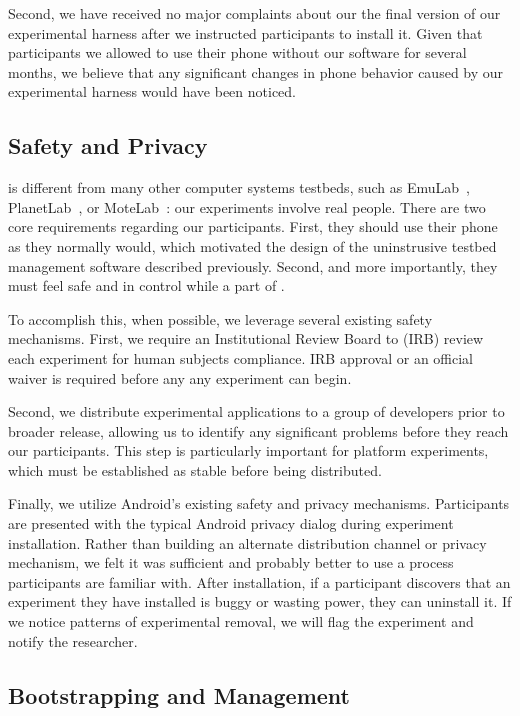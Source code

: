 Second, we have received no major complaints about our the final version of
our \PhoneLab{} experimental harness after we instructed participants to
install it. Given that participants we allowed to use their phone without our
software for several months, we believe that any significant changes in phone
behavior caused by our experimental harness would have been noticed.

\subsection{Safety and Privacy}

\PhoneLab{} is different from many other computer systems testbeds, such as
EmuLab~\cite{FIXME}, PlanetLab~\cite{FIXME}, or MoteLab~\cite{FIXME}: our
experiments involve real people. There are two core requirements regarding
our participants. First, they should use their phone as they normally would,
which motivated the design of the uninstrusive testbed management software
described previously. Second, and more importantly, they must feel safe and
in control while a part of \PhoneLab{}.

To accomplish this, when possible, we leverage several existing safety
mechanisms. First, we require an Institutional Review Board to (IRB) review
each \PhoneLab{} experiment for human subjects compliance. IRB approval or an
official waiver is required before any \PhoneLab{} any experiment can begin.

Second, we distribute experimental applications to a group of developers
prior to broader release, allowing us to identify any significant problems
before they reach our participants. This step is particularly important for
platform experiments, which must be established as stable before being
distributed.

Finally, we utilize Android's existing safety and privacy mechanisms.
Participants are presented with the typical Android privacy dialog during
experiment installation. Rather than building an alternate distribution
channel or privacy mechanism, we felt it was sufficient and probably better
to use a process participants are familiar with. After installation, if a
participant discovers that an experiment they have installed is buggy or
wasting power, they can uninstall it. If we notice patterns of experimental
removal, we will flag the experiment and notify the researcher.

\subsection{Bootstrapping and Management}

